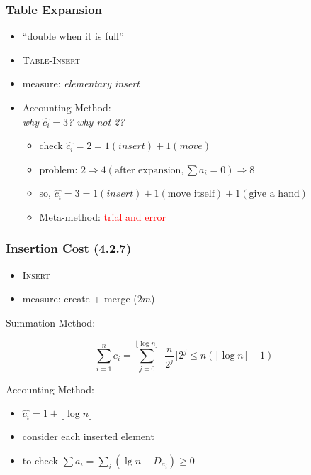 \documentclass{beamer}
\begin{document}
\begin{frame}
  \frametitle{Table Expansion}
  
  \begin{example}
    \begin{itemize}
      \item ``double when it is full''
      \item \textsc{Table-Insert}
      \item measure: \emph{elementary insert}
    \end{itemize}
    \begin{itemize}
      \item Accounting Method: \\
        \emph{why $\hat{c_i} = 3$? why not 2?}
        \begin{itemize}
          \setlength{\itemsep}{3pt}
          \item check $\hat{c_i} = 2 = 1 (insert) + 1 (move)$
		  \item problem: $2 \Rightarrow 4 (\textrm{after expansion}, \sum a_i = 0)
		  \Rightarrow 8$
		  \item so, $\hat{c_i} = 3 = 1 (insert) + 1 (\textrm{move itself}) + 1
		  (\textrm{give a hand})$
		  \item Meta-method: \textcolor{red}{trial and error} 
        \end{itemize}
    \end{itemize}
  \end{example}
\end{frame}

\begin{frame}
  \frametitle{Insertion Cost (4.2.7)}
  
  \begin{example}
    \begin{itemize}
      \item \textsc{Insert}
      \item measure: create + merge ($2m$)
    \end{itemize}
    Summation Method: 

	  \[
		\sum_{i=1}^{n} c_i = \sum_{j=0}^{\lfloor \log n \rfloor} \lfloor \frac{n}{2^j} \rfloor 2^j \le n (\lfloor \log n \rfloor + 1)
	  \]
    
    Accounting Method: 
      \begin{itemize}
        \item $\hat{c_i} = 1 + \lfloor \log n \rfloor$
        \item consider each inserted element
        \item to check $\sum a_i = \sum_{i} (\lg n - D_{a_i}) \geq 0$
      \end{itemize}
  \end{example}
\end{frame}
\end{document}
